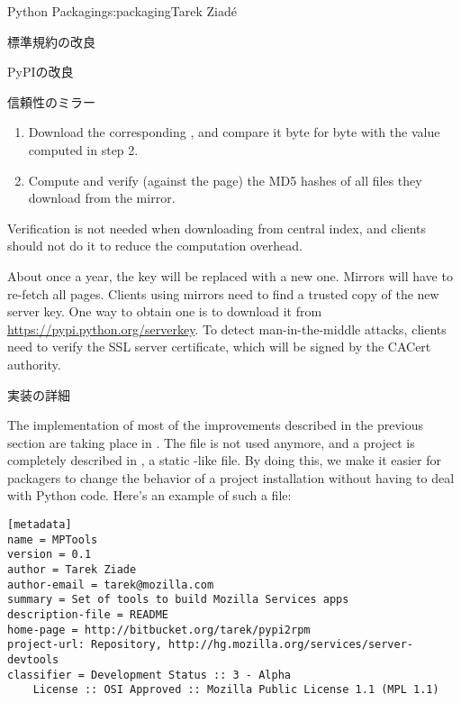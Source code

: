\begin{aosachapter}{Python Packaging}{s:packaging}{Tarek Ziad\'{e}}
\begin{aosasect1}{標準規約の改良}
\begin{aosasect2}{PyPIの改良}
\begin{aosasect3}{信頼性のミラー}
\begin{enumerate}
  \item Download the corresponding , and compare it
  byte for byte with the value computed in step 2.

  \item Compute and verify (against the  page) the MD5
  hashes of all files they download from the mirror.

\end{enumerate}

Verification is not needed when downloading from central index, and
clients should not do it to reduce the computation overhead.

About once a year, the key will be replaced with a new one. Mirrors
will have to re-fetch all  pages. Clients using
mirrors need to find a trusted copy of the new server key. One way to
obtain one is to download it from
\url{https://pypi.python.org/serverkey}.  To detect man-in-the-middle
attacks, clients need to verify the SSL server certificate, which will
be signed by the CACert authority.

\end{aosasect3}

\end{aosasect2}

\end{aosasect1}

\begin{aosasect1}{実装の詳細}

The implementation of most of the improvements described in the previous
section are taking place in .  The 
file is not used anymore, and a project is completely described in
, a static -like file.  By doing this, we
make it easier for packagers to change the behavior of a project
installation without having to deal with Python code.  Here's an
example of such a file:

\begin{verbatim}
[metadata]
name = MPTools
version = 0.1
author = Tarek Ziade
author-email = tarek@mozilla.com
summary = Set of tools to build Mozilla Services apps
description-file = README
home-page = http://bitbucket.org/tarek/pypi2rpm
project-url: Repository, http://hg.mozilla.org/services/server-devtools
classifier = Development Status :: 3 - Alpha
    License :: OSI Approved :: Mozilla Public License 1.1 (MPL 1.1)
\end{verbatim}


\end{aosasect1}
\end{aosachapter}
